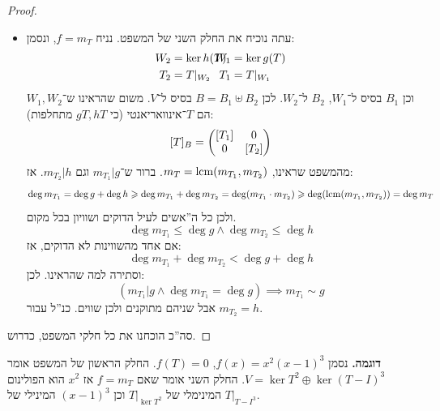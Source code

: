 \documentclass[name=רשימות אלגברה לינארית 2א]{../../../tex/classes/megasumPreamble}
\begin{document}
\begin{proof}
\begin{itemize}
			הטענה ש־$(aT \circ gT)v \in \ker hT$ נובעת מכך ש־[כאשר פעולת הכפל בין פולינומים מוגדרת להיות הרכבה]: 
			\[ (hT)((aT \circ gT)v) = hT((ag(T))v) = (hag)Tv = ((agh)T)v = ((af)T)v = (aT)(fT)v = (a(T) \cdot 0)v = 0v = 0 \]
			(זאת כי הרכבת פולינומים קוממטיבי, כל עולמות הדיון אסוציאטיביים, וכאשר ההעתקה $aT$ תקבל את $fT = 0$ היא תחזיר אפס וסה''כ $0v = 0$ כדרוש). מהכיוון השני: 
			\[ (gT)((bT \circ hT)v) = gT((bh(T))v) = (gbh)Tv = ((bgh)T)v = ((bf)T)v = (bT)(fT)v = (b(T) \cdot 0)v = 0v = 0 \]
			כלומר אכן $(aT \circ gT)(v) \in \ker hT$ ו־$(bT \circ hT)(v) \in \ker gT$. מהשוויון לעיל סה''כ אכן $V = \ker h(T) + \ker g(T)$. הסכום אכן ישר שכן: 
			\[ \forall v \in \ker gT \cap \ker hT \co 0 + 0 = (aT \circ gT)v + (bT + hT)v = v \]
			דהיינו, $\ker g(T) \oplus \ker h(T) = V$ כדרוש מהחלק הראשון של המשפט. 
			\item עתה נוכיח את החלק השני של המשפט. נניח $f = m_T$, ונסמן: 
			\begin{align*}
				W_2 &= \ker h(T) \dequad&\dequad W_1 &= \ker g(T) \\
				T_2 &=  T|_{{W_2}} \dequad&\dequad T_1 &= T|_{{W_1}}
			\end{align*}
			וכן $B_1$ בסיס ל־$W_1$, $B_2$ ל־$W_2$. לכן $B = B_1 \uplus B_2$ בסיס ל־$V$. משום שהראינו ש־$W_1, W_2$ הם $T$־אינוואריאנטי (כי $gT, hT$ מתחלפות): 
			\[ [T]_B = \begin{pmatrix} [T_1] & 0 \\ 0 & [T_2] \end{pmatrix} \]
			מהמשפט שראינו, $m_T = \operatorname{lcm}(m_{T_1}, m_{T_2})$. ברור ש־$m_{T_1} | g$ וגם $m_{T_2} | h$. אז: 
			\[ \deg m_{T_1} = \deg g + \deg h \geqslant \deg m_{T_1} + \deg m_{T_2} = \deg(m_{T_1} \cdot m_{T_2}) \geqslant \deg(\operatorname{lcm}(m_{T_1}, m_{T_2})) = \deg m_T \]
			ולכן כל ה''אשים לעיל הדוקים ושוויון בכל מקום. 
			\[ \deg m_{T_1} \le \deg g \land \deg m_{T_2} \le \deg h \]
			אם אחד מהשווינות לא הדוקים, אז: 
			\[ \deg m_{T_1} + \deg m_{T_2} < \deg g + \deg h \]
			וסתירה למה שהראינו. לכן: 
			\[ (m_{T_1} | g \land \deg m_{T_1} = \deg g) \implies m_{T_1} \sim g \]
			אבל שניהם מתוקנים ולכן שווים. כנ''ל עבור $m_{T_2} = h$. 
		\end{itemize}
		סה''כ הוכחנו את כל חלקי המשפט, כדרוש. 
	\end{proof}
	
	
	\textbf{דוגמה. }נסמן $f(x) = x^{2}(x - 1)^{3}$, $f(T) = 0$. החלק הראשון של המשפט אומר $V = \ker T^2 \oplus \ker (T - I)^3$. החלק השני אומר שאם $f = m_T$ אז $x^2$ הוא הפולינום המינימלי של $T|_{{\ker T^2}}$ וכן $(x - 1)^{3}$ המינילי של $T|_{{T - I}^{3}}$. 
	
\end{document}
